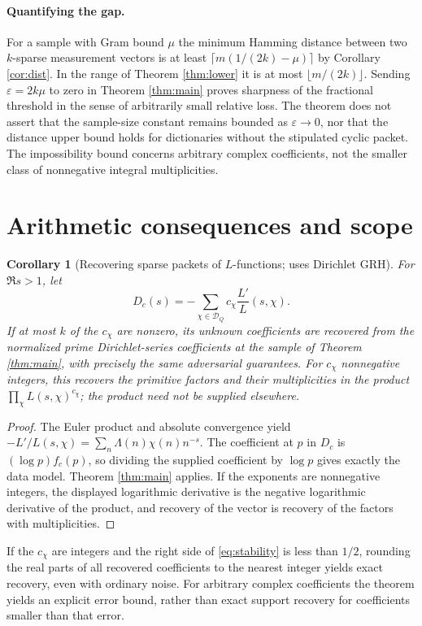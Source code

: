 \documentclass[11pt]{article}
\newtheorem{corollary}[theorem]{Corollary}
\theoremstyle{remark}\newtheorem{remark}[theorem]{Remark}
\newcommand{\D}{\mathcal D}
\newcommand{\eps}{\varepsilon}
\begin{document}
\paragraph{Quantifying the gap.}
For a sample with Gram bound $\mu$ the minimum Hamming distance between two $k$-sparse measurement vectors is at least $\lceil m(1/(2k)-\mu)\rceil$ by Corollary \ref{cor:dist}. In the range of Theorem \ref{thm:lower} it is at most $\lfloor m/(2k)\rfloor$. Sending $\eps=2k\mu$ to zero in Theorem \ref{thm:main} proves sharpness of the fractional threshold in the sense of arbitrarily small relative loss. The theorem does not assert that the sample-size constant remains bounded as $\eps\to0$, nor that the distance upper bound holds for dictionaries without the stipulated cyclic packet. The impossibility bound concerns arbitrary complex coefficients, not the smaller class of nonnegative integral multiplicities.

\section{Arithmetic consequences and scope}
\begin{corollary}[Recovering sparse packets of $L$-functions; uses Dirichlet GRH]\label{cor:L}
For $\Re s>1$, let
\[
 D_c(s)=-\sum_{\chi\in\D_Q}c_\chi\frac{L'}{L}(s,\chi).
\]
If at most $k$ of the $c_\chi$ are nonzero, its unknown coefficients are recovered from the normalized prime Dirichlet-series coefficients at the sample of Theorem \ref{thm:main}, with precisely the same adversarial guarantees. For $c_\chi$ nonnegative integers, this recovers the primitive factors and their multiplicities in the product $\prod_\chi L(s,\chi)^{c_\chi}$; the product need not be supplied elsewhere.
\end{corollary}
\begin{proof}
The Euler product and absolute convergence yield $-L'/L(s,\chi)=\sum_n\Lambda(n)\chi(n)n^{-s}$. The coefficient at $p$ in $D_c$ is $(\log p)f_c(p)$, so dividing the supplied coefficient by $\log p$ gives exactly the data model. Theorem \ref{thm:main} applies. If the exponents are nonnegative integers, the displayed logarithmic derivative is the negative logarithmic derivative of the product, and recovery of the vector is recovery of the factors with multiplicities.
\end{proof}
If the $c_\chi$ are integers and the right side of \eqref{eq:stability} is less than $1/2$, rounding the real parts of all recovered coefficients to the nearest integer yields exact recovery, even with ordinary noise. For arbitrary complex coefficients the theorem yields an explicit error bound, rather than exact support recovery for coefficients smaller than that error.
\end{document}
